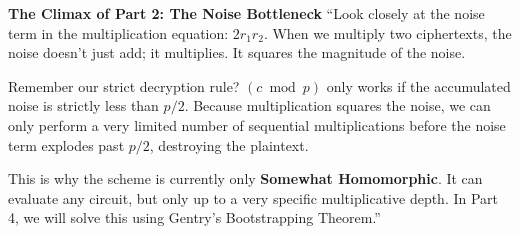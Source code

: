 \documentclass[11pt]{article}
\begin{document}
\begin{speakernote}
\textbf{The Climax of Part 2: The Noise Bottleneck}
``Look closely at the noise term in the multiplication equation: $2r_1 r_2$. When we multiply two ciphertexts, the noise doesn't just add; it multiplies. It squares the magnitude of the noise. 

Remember our strict decryption rule? $(c \bmod p)$ only works if the accumulated noise is strictly less than $p/2$. Because multiplication squares the noise, we can only perform a very limited number of sequential multiplications before the noise term explodes past $p/2$, destroying the plaintext. 

This is why the scheme is currently only \textbf{Somewhat Homomorphic}. It can evaluate any circuit, but only up to a very specific multiplicative depth. In Part 4, we will solve this using Gentry's Bootstrapping Theorem.''
\end{speakernote}
\end{document}
